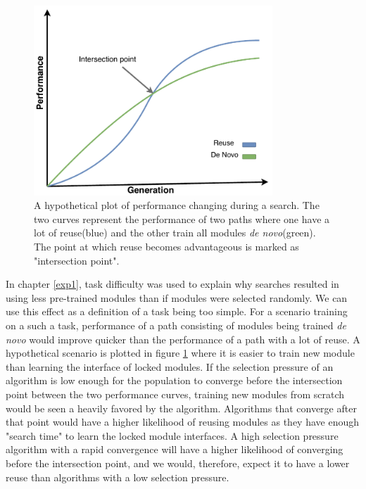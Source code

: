 \begin{figure}[ht]
    \centering
    \includegraphics[width=0.8\textwidth]{Chapters/4.Experiments/exp2/figures/reuse_vs_new.pdf}
    \caption[Hypothetical performance plot]{A hypothetical plot of performance changing during a search. The two curves represent the performance of two paths where one have a lot of reuse(blue) and the other train all modules \textit{de novo}(green). The point at which reuse becomes advantageous is marked as "intersection point".}
    \label{fig:reuse_vs_new}
\end{figure}

In chapter \ref{exp1}, task difficulty was used to explain why searches resulted in using less pre-trained modules than if modules were selected randomly. We can use this effect as a definition of a task being too simple. For a scenario training on a such a task, performance of a path consisting of modules being trained \textit{de novo} would improve quicker than the performance of a path with a lot of reuse. A hypothetical scenario is plotted in figure \ref{fig:reuse_vs_new} where it is easier to train new module than learning the interface of locked modules. If the selection pressure of an algorithm is low enough for the population to converge before the intersection point between the two performance curves, training new modules from scratch would be seen a heavily favored by the algorithm.  Algorithms that converge after that point would have a higher likelihood of reusing modules as they have enough "search time" to learn the locked module interfaces. A high selection pressure algorithm with a rapid convergence will have a higher likelihood of converging before the intersection point, and we would, therefore, expect it to have a lower reuse than algorithms with a low selection pressure. 

